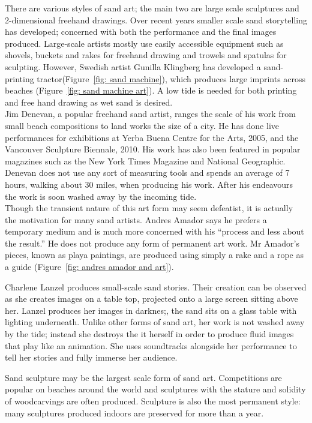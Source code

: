         There are various styles of sand art; the main two are large scale sculptures and 2-dimensional freehand drawings. Over recent years smaller scale sand storytelling has developed; concerned with both the performance and the final images produced. Large-scale artists mostly use easily accessible equipment such as shovels, buckets and rakes for freehand drawing and trowels and spatulas for sculpting. However, Swedish artist Gunilla Klingberg has developed a sand-printing tractor(Figure~\ref{fig: sand machine}), which produces large imprints across beaches (Figure~\ref{fig: sand machine art}). A low tide is needed for both printing and free hand drawing as wet sand is desired.\\
        Jim Denevan, a popular freehand sand artist, ranges the scale of his work from small beach compositions to land works the size of a city. He has done live performances for exhibitions at Yerba Buena Centre for the Arts, 2005, and the Vancouver Sculpture Biennale, 2010. His work has also been featured in popular magazines such as the New York Times Magazine and National Geographic. Denevan does not use any sort of measuring tools and spends an average of 7 hours, walking about 30 miles, when producing his work. After his endeavours the work is soon washed away by the incoming tide.\\
        Though the transient nature of this art form may seem defeatist, it is actually the motivation for many sand artists. Andres Amador says he prefers a temporary medium and is much more concerned with his ``process and less about the result.'' He does not produce any form of permanent art work. Mr Amador's pieces, known as playa paintings, are produced using simply a rake and a rope as a guide (Figure~\ref{fig: andres amador and art}).

        Charlene Lanzel produces small-scale sand stories. Their creation can be observed as she creates images on a table top, projected onto a large screen sitting above her. Lanzel produces her images in darknes;, the sand sits on a glass table with lighting underneath. Unlike other forms of sand art, her work is not washed away by the tide; instead she destroys the it herself in order to produce fluid images that play like an animation. She uses soundtracks alongside her performance to tell her stories and fully immerse her audience.

        Sand sculpture may be the largest scale form of sand art. Competitions are popular on beaches around the world and sculptures with the stature and solidity of woodcarvings are often produced.  Sculpture is also the most permanent style: many sculptures produced indoors are preserved for more than a year.

